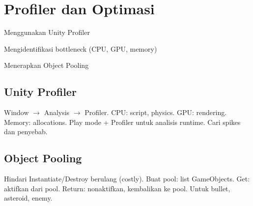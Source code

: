 \section{Profiler dan Optimasi}

\begin{learningoutcomes}
\item Menggunakan Unity Profiler
\item Mengidentifikasi bottleneck (CPU, GPU, memory)
\item Menerapkan Object Pooling
\end{learningoutcomes}

\subsection{Unity Profiler}

Window $\rightarrow$ Analysis $\rightarrow$ Profiler. CPU: script, physics. GPU: rendering. Memory: allocations. Play mode + Profiler untuk analisis runtime. Cari spikes dan penyebab.

\subsection{Object Pooling}

Hindari Instantiate/Destroy berulang (costly). Buat pool: list GameObjects. Get: aktifkan dari pool. Return: nonaktifkan, kembalikan ke pool. Untuk bullet, asteroid, enemy.

